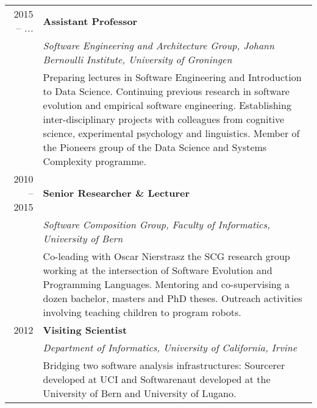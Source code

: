 
\newcommand{\job}[4]
	{#1 & %

	{\bf #3}\\ & %

	{\em #2} \vspace{0.2em} \\ & %


	{#4} \vspace{1em} \\} %

\begin{tabular}{r p{12cm}}

	\job
	{2015 -- {\em ...}}
	{Software Engineering and Architecture Group, Johann Bernoulli Institute, University of Groningen}
	{
	Assistant Professor}
	{Preparing lectures in Software Engineering and Introduction to Data Science. Continuing previous research in software evolution and empirical software engineering. Establishing inter-disciplinary projects with colleagues from cognitive science, experimental psychology and linguistics. Member of the Pioneers group of the Data Science and Systems Complexity programme.}



	\job
	{2010 -- 2015}
	{Software Composition Group, Faculty of Informatics, University of Bern}
	{Senior Researcher \& Lecturer}
	{
	Co-leading with Oscar Nierstrasz the SCG research group working at the intersection of Software Evolution and Programming Languages. Mentoring and co-supervising a dozen bachelor, masters and PhD theses. Outreach activities involving teaching children to program robots.}

	\job
	{2012}
	{Department of Informatics, University of California, Irvine}
	{Visiting Scientist}
	{
	Bridging two software analysis infrastructures: Sourcerer developed at UCI and Softwarenaut developed at the University of Bern and University of Lugano. 
	}



\end{tabular}
